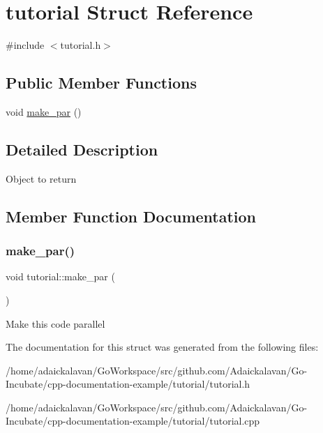 \hypertarget{structtutorial}{}\section{tutorial Struct Reference}
\label{structtutorial}


{\ttfamily \#include $<$tutorial.\+h$>$}

\subsection*{Public Member Functions}
\begin{DoxyCompactItemize}
\item 
void \hyperlink{structtutorial_af846c418864f02b88a259ccd0d1b81b5}{make\+\_\+par} ()
\end{DoxyCompactItemize}


\subsection{Detailed Description}
Object to return 

\subsection{Member Function Documentation}
\mbox{\label{structtutorial_af846c418864f02b88a259ccd0d1b81b5}} 
\subsubsection{\texorpdfstring{make\+\_\+par()}{make\_par()}}
{\footnotesize\ttfamily void tutorial\+::make\+\_\+par (\begin{DoxyParamCaption}{ }\end{DoxyParamCaption})}

Make this code parallel 

The documentation for this struct was generated from the following files\+:\begin{DoxyCompactItemize}
\item 
/home/adaickalavan/\+Go\+Workspace/src/github.\+com/\+Adaickalavan/\+Go-\/\+Incubate/cpp-\/documentation-\/example/tutorial/tutorial.\+h\item 
/home/adaickalavan/\+Go\+Workspace/src/github.\+com/\+Adaickalavan/\+Go-\/\+Incubate/cpp-\/documentation-\/example/tutorial/tutorial.\+cpp\end{DoxyCompactItemize}
